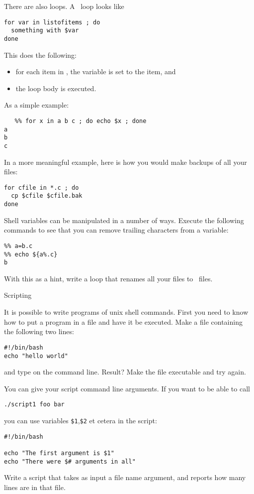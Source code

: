 There are also loops. A~ loop looks like
\begin{verbatim}
for var in listofitems ; do
  something with $var
done
\end{verbatim}
This does the following:
\begin{itemize}
\item for each item in , the variable  is set to the
  item, and
\item the loop body is executed.
\end{itemize}
As a simple example:
\begin{verbatim}
   %% for x in a b c ; do echo $x ; done
a
b
c
\end{verbatim}
In a more meaningful example,
here is how you would make backups of all your~
files:
\begin{verbatim}
for cfile in *.c ; do
  cp $cfile $cfile.bak
done
\end{verbatim}
Shell variables can be manipulated in a number of ways.
Execute the following commands to see that you can remove trailing
characters from a variable:
\begin{verbatim}
%% a=b.c
%% echo ${a%.c}
b
\end{verbatim}
With this as a hint, write a loop that renames all your  files
to~ files.

 {Scripting}

It is possible to write programs of unix shell commands. First you
need to know how to put a program in a file and have it be
executed. Make a file  containing the following two lines:
\begin{verbatim}
#!/bin/bash
echo "hello world"
\end{verbatim}
and type  on the command line. Result?
Make the file executable and try again.

You can give your script command line arguments. If you want to be
able to call
\begin{verbatim}
./script1 foo bar
\end{verbatim}
you can use variables \verb+$1+,\verb+$2+ et cetera in the script:
\begin{verbatim}
#!/bin/bash

echo "The first argument is $1"
echo "There were $# arguments in all"
\end{verbatim}

Write a script that takes as input a file name argument, and reports how many
lines are in that file.

